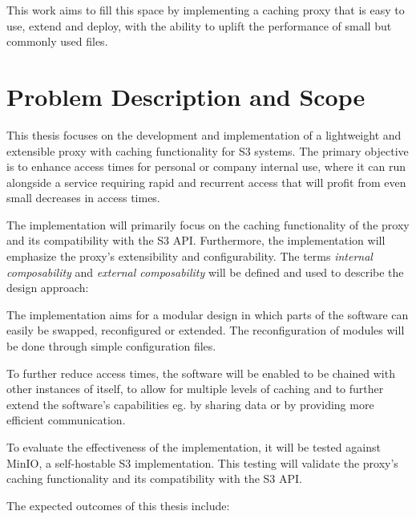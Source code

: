 This work aims to fill this space by implementing a caching proxy that is easy to use, extend and deploy, with the ability to uplift the performance of small but commonly used files.

\section{Problem Description and Scope}
\label{goals}

This thesis focuses on the development and implementation of a lightweight and extensible proxy with caching functionality for S3 systems. The primary objective is to enhance access times for personal or company internal use, where it can run alongside a service requiring rapid and recurrent access that will profit from even small decreases in access times.

The implementation will primarily focus on the caching functionality of the proxy and its compatibility with the S3 API.
Furthermore, the implementation will emphasize the proxy's extensibility and configurability. The terms \textit{internal composability} and \textit{external composability} will be defined and used to describe the design approach:

\begin{description}
	\label{def:composition}
	\item[Internal composability] The implementation aims for a modular design in which parts of the software can easily be swapped, reconfigured or extended. The reconfiguration of modules will be done through simple configuration files.
	\item[External composability] To further reduce access times, the software will be enabled to be chained with other instances of itself, to allow for multiple levels of caching and to further extend the software's capabilities eg. by sharing data or by providing more efficient communication.
\end{description}

To evaluate the effectiveness of the implementation, it will be tested against MinIO, a self-hostable S3 implementation. This testing will validate the proxy's caching functionality and its compatibility with the S3 API.

The expected outcomes of this thesis include:

